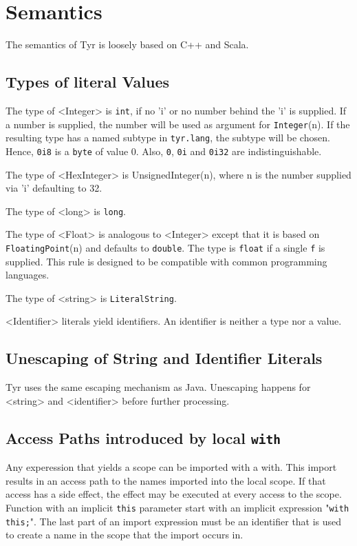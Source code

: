 \section{Semantics}

The semantics of Tyr is loosely based on C++ and Scala.

\subsection{Types of literal Values}

The type of <Integer> is \texttt{int}, if no 'i' or no number behind the 'i' is supplied.
If a number is supplied, the number will be used as argument for \texttt{Integer}(n).
If the resulting type has a named subtype in \texttt{tyr.lang}, the subtype will be chosen.
Hence, \texttt{0i8} is a \texttt{byte} of value 0.
Also, \texttt{0}, \texttt{0i} and \texttt{0i32} are indistinguishable.

The type of <HexInteger> is UnsignedInteger(n), where n is the number supplied via 'i' defaulting to 32.

The type of <long> is \texttt{long}.

The type of <Float> is analogous to <Integer> except that it is based on \texttt{FloatingPoint}(n) and defaults to \texttt{double}.
The type is \texttt{float} if a single \texttt{f} is supplied.
This rule is designed to be compatible with common programming languages.

The type of <string> is \texttt{LiteralString}.

<Identifier> literals yield identifiers.
An identifier is neither a type nor a value.

\subsection{Unescaping of String and Identifier Literals}

Tyr uses the same escaping mechanism as Java.
Unescaping happens for <string> and <identifier> before further processing.


\subsection{Access Paths introduced by local \texttt{with}}

Any experession that yields a scope can be imported with a with.
This import results in an access path to the names imported into the local scope.
If that access has a side effect, the effect may be executed at every access to the scope.
Function with an implicit \texttt{this} parameter start with an implicit expression "\texttt{with this;}".
The last part of an import expression must be an identifier that is used to create a name in the scope that the import occurs in.

